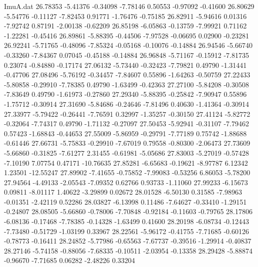 \begin{filecontents}{ImuA.dat}
  26.78353   -5.41376   -0.34098   -7.78146    0.50553   -0.97092   -0.41600
  26.80629   -5.54776   -0.11127   -7.82453    0.91771   -1.76476   -0.75185
  26.82911   -5.94616    0.01316   -7.92742    0.87191   -2.00138   -0.62209
  26.85198   -6.05863   -0.13759   -7.99921    0.71162   -1.22281   -0.45416
  26.89861   -5.88395   -0.44506   -7.97528   -0.06695    0.02900   -0.23281
  26.92241   -5.71765   -0.48096   -7.85324   -0.05168   -0.10076   -0.14884
  26.94546   -5.66740   -0.33260   -7.84367    0.07045   -0.45188   -0.14884
  26.96848   -5.71167   -0.15912   -7.81735    0.23074   -0.84880   -0.17174
  27.06132   -5.73440   -0.32423   -7.79821    0.49790   -1.31441   -0.47706
  27.08496   -5.76192   -0.34457   -7.84607    0.55896   -1.64263   -0.50759
  27.22433   -5.80858   -0.29910   -7.78385    0.49790   -1.63499   -0.42363
  27.27100   -5.84208   -0.30508   -7.83649    0.49790   -1.61973   -0.27860
  27.29340   -5.88395   -0.25842   -7.90947    0.55896   -1.75712   -0.30914
  27.31690   -5.84686   -0.24646   -7.81496    0.40630   -1.41364   -0.30914
  27.33977   -5.79422   -0.26441   -7.76591    0.32997   -1.35257   -0.30150
  27.41124   -5.82772   -0.32064   -7.74317    0.49790   -1.71132   -0.27097
  27.50453   -5.92941   -0.31107   -7.79462    0.57423   -1.68843   -0.44653
  27.55009   -5.86959   -0.29791   -7.77189    0.75742   -1.88688   -0.61446
  27.66731   -5.75833   -0.29910   -7.67019    0.79558   -0.80300   -2.06473
  27.73609   -5.66860   -0.31825   -7.61277    2.31455   -0.61981   -5.05686
  27.83003   -5.27019   -0.57428   -7.10190    7.07754    0.47171  -10.76635
  27.85281   -6.65683   -0.19621   -8.97787    6.12342    1.23501  -12.55247
  27.89902   -7.41655   -0.75852   -7.99083   -0.53256    6.86053   -5.78200
  27.94564   -4.49133   -2.05543   -7.09352    0.62766    0.93733   -1.11060
  27.99233   -6.15673    0.09811   -8.01117    1.40622   -3.29899    0.02672
  28.01528   -6.50130    0.31585   -7.98963   -0.01351   -2.42119    0.52286
  28.03827   -6.13998    0.11486   -7.64627   -0.33410   -1.29151   -0.24807
  28.08505   -5.66860   -0.78006   -7.70848   -0.92184   -0.11603   -0.79765
  28.17806   -6.08136   -0.17468   -7.78385   -0.14328   -1.63499    0.41600
  28.20198   -6.08734   -0.12443   -7.73480   -0.51729   -1.03199    0.33967
  28.22561   -5.96172   -0.41755   -7.71685   -0.60126   -0.78773   -0.16411
  28.24852   -5.77986   -0.65563   -7.67737   -0.39516   -1.29914   -0.40837
  28.27146   -5.74158   -0.88056   -7.68335   -0.10511   -2.03954   -0.13358
  28.29428   -5.88874   -0.96670   -7.71685    0.06282   -2.48226    0.33204

\end{filecontents}
